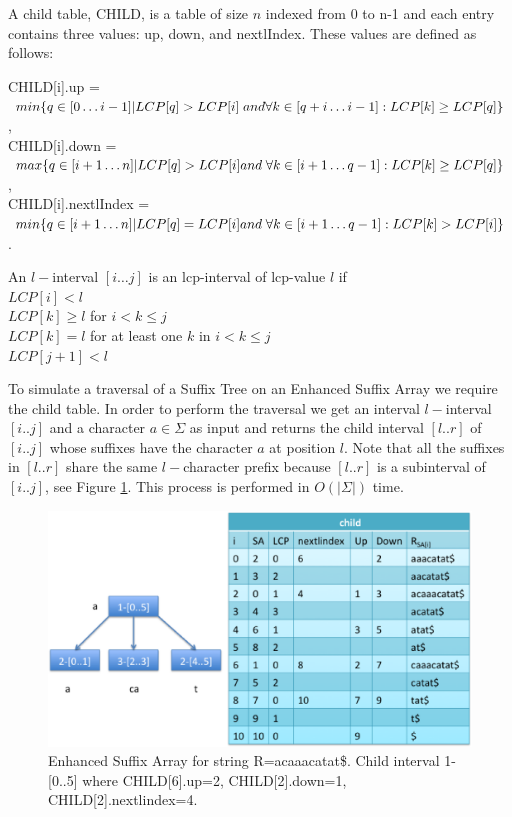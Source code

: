 \documentclass{acm_proc_article-sp}
\begin{document}
\begin{definition}
A child table, CHILD, is a table of size $n$ indexed from 0 to n-1 and each entry contains three values: up, down, and nextlIndex. These values are defined as follows: 

CHILD[i].up = $min\{q\in [0\ldots i-1]|LCP[q]>LCP[i]\;and\;\\
\forall k\in[q+i\ldots i-1]:LCP[k]\geq LCP[q]\}$,\\
CHILD[i].down = $max\{q\in[i+1\ldots n]|LCP[q]>LCP[i]\\
and\;\forall k\in[i+1\ldots q-1]:LCP[k]\geq LCP[q]\}$,\\
CHILD[i].nextlIndex = $min\{q\in[i+1\ldots n]|LCP[q]=LCP[i]\\
and\;\forall k\in[i+1\ldots q-1]:LCP[k]>LCP[i]\}$.
\end{definition}
\begin{definition}
An $l-$interval $[i\ldots j]$ is an lcp-interval of lcp-value $l$ if\\
$LCP[i]<l$\\
$LCP[k]\geq l$ for $i<k\leq j$\\
$LCP[k]=l$ for at least one $k$ in $i<k\leq j$\\
$LCP[j+1]<l$
\end{definition}
To simulate a traversal of a Suffix Tree on an Enhanced Suffix Array we require the child table. In order to perform the traversal we get an interval $l-$interval $[i..j]$ and a character $a\in \Sigma$ as input and returns the child interval $[l..r]$ of $[i..j]$ whose suffixes have the character $a$ at position $l$. Note that all the suffixes in $[l..r]$ share the same $l-$character prefix because $[l..r]$ is a subinterval of $[i..j]$, see Figure \ref{fig:esa}. This process is performed in $O(|\Sigma|)$ time.
\begin{figure}[h]
  \centering
  \includegraphics[scale=0.35]{child.eps}
  \caption{Enhanced Suffix Array for string R=acaaacatat\$. Child interval 1-[0..5] where CHILD[6].up=2, CHILD[2].down=1, CHILD[2].nextlindex=4.}
  \label{fig:esa}
 \end{figure}  
\end{document}
